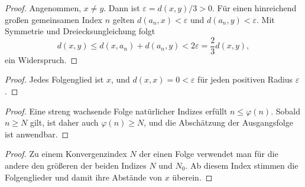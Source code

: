 \documentclass[main.tex]{subfiles}
\begin{document}
\begin{proof}
Angenommen, \(x\neq y\). Dann ist
\(\varepsilon=d(x,y)/3>0\). Für einen hinreichend großen gemeinsamen
Index \(n\) gelten
\(d(a_n,x)<\varepsilon\) und \(d(a_n,y)<\varepsilon\). Mit Symmetrie und
Dreiecksungleichung folgt
\[
 d(x,y)\leq d(x,a_n)+d(a_n,y)
 <2\varepsilon=\frac23d(x,y),
\]
ein Widerspruch.
\end{proof}

\begin{proof}
Jedes Folgenglied ist \(x\), und \(d(x,x)=0<\varepsilon\) für jeden
positiven Radius \(\varepsilon\).
\end{proof}

\begin{proof}
Eine streng wachsende Folge natürlicher Indizes erfüllt
\(n\leq\varphi(n)\). Sobald \(n\geq N\) gilt, ist daher auch
\(\varphi(n)\geq N\), und die Abschätzung der Ausgangsfolge ist anwendbar.
\end{proof}

\begin{proof}
Zu einem Konvergenzindex \(N\) der einen Folge verwendet man für die andere
den größeren der beiden Indizes \(N\) und \(N_0\). Ab diesem Index stimmen
die Folgenglieder und damit ihre Abstände von \(x\) überein.
\end{proof}
\end{document}
